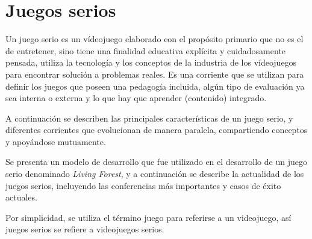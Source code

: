 \chapter{Juegos serios}
\label{chap:juegos_serios}


Un juego serio es un vídeojuego elaborado con el propósito primario que no es el
de entretener\cite{sg:aoverview}, sino tiene una finalidad educativa explícita y
cuidadosamente pensada, utiliza la tecnología y los conceptos de la industria de
los vídeojuegos para encontrar solución a problemas reales. Es una corriente que
se utilizan para definir los juegos que poseen una pedagogía incluida, algún
tipo de evaluación ya sea interna o externa y lo que hay que aprender
(contenido) integrado\cite{damien:sg}.

A continuación se describen las principales características de un juego serio, y
diferentes corrientes que evolucionan de manera paralela, compartiendo conceptos
y apoyándose mutuamente.

Se presenta un modelo de desarrollo que fue utilizado en el desarrollo de un
juego serio denominado \textit{Living Forest}, y a continuación se describe la
actualidad de los juegos serios, incluyendo las conferencias más importantes y
casos de éxito actuales.

Por simplicidad, se utiliza el término juego para referirse a un videojuego, así
juegos serios se refiere a videojuegos serios.








